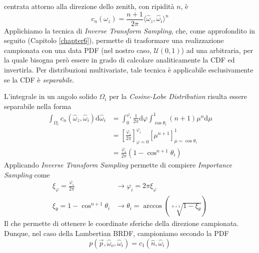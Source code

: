 centrata attorno alla direzione dello zenith, con ripidit\`a $n$, \`e
\begin{equation}
	c_n(\omega_z) = \frac{n+1}{2\pi}\langle\hat{\omega}_z,\hat{\omega}_i\rangle^n
\end{equation}
Applichiamo la tecnica di \textit{Inverse Transform Sampling}, che, come approfondito in seguito (Capitolo \ref{chapter6}), permette di trasformare
una realizzazione campionata con una data PDF (nel nostro caso, $\mathcal{U}(0,1)$) ad una arbitraria, per la quale bisogna per\`o essere in grado di 
calcolare analiticamente la CDF ed invertirla. Per distribuzioni multivariate, tale tecnica \`e applicabile esclusivamente se la CDF \`e 
\textit{separabile}.\par
L'integrale in un angolo solido $\Omega_i$ per la \textit{Cosine-Lobe Distribution} risulta essere separabile nella forma
\begin{align}
	\int_{\Omega_i}c_n(\hat{\omega}_z,\hat{\omega}_i)\mathrm{d}\hat{\omega}_i &= \int_0^{\varphi_i}\frac{1}{2\pi}\mathrm{d}\varphi%
		\int_{\cos\theta_i}^1(n+1)\mu^n\mathrm{d}\mu \nonumber \\ 
	&= \left[\frac{\varphi_i}{2\pi}\right]_{\varphi=0}^{\varphi_i}\left[\mu^{n+1}\right]_{\mu=\cos\theta_i}^1 \nonumber \\
	&= \frac{\varphi_i}{2\pi}\left(1-\cos^{n+1}\theta_i\right)
\end{align}
Applicando \textit{Inverse Transform Sampling} permette di compiere \textit{Importance Sampling} come
\begin{align}
	\xi_\varphi = \frac{\varphi_i}{2\pi} &\longrightarrow\varphi_i = 2\pi\xi_\varphi \\
	\xi_\theta = 1-\cos^{n+1}\theta_i &\longrightarrow\theta_i = \arccos\left(\sqrt[n+1]{1-\xi_\theta}\right)
\end{align}
Il che permette di ottenere le coordinate sferiche della direzione campionata. Dunque, nel caso della Lambertian BRDF, campioniamo secondo la PDF
\begin{equation}
	p(\vec{p},\hat{\omega}_o,\hat{\omega}_i) = c_1(\hat{n},\hat{\omega}_i)
\end{equation}
